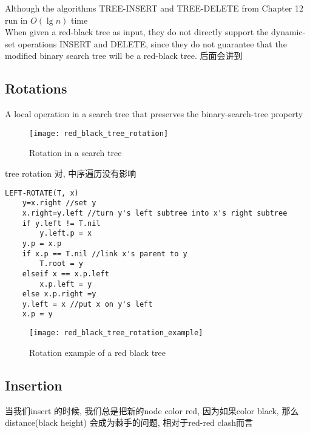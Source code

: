 \documentclass{article}
\begin{document}
Although the algorithms TREE-INSERT and TREE-DELETE from Chapter 12 run in $O(\lg n)$ time\\
When given a red-black tree as input, they do not directly support the dynamic-set operations INSERT and DELETE, since they do not guarantee that the modified binary search tree will be a red-black tree. 后面会讲到

\subsection{Rotations}
A local operation in a search tree that preserves the binary-search-tree property
\begin{figure}[htbp]
  \centering
  \texttt{[image: red\_black\_tree\_rotation]}\\
  \caption{Rotation in a search tree}\label{fig.rbt.rotation}
\end{figure}
tree rotation 对, 中序遍历没有影响

\begin{verbatim}
LEFT-ROTATE(T, x)
    y=x.right //set y
    x.right=y.left //turn y's left subtree into x's right subtree
    if y.left != T.nil
        y.left.p = x
    y.p = x.p
    if x.p == T.nil //link x's parent to y
        T.root = y
    elseif x == x.p.left
        x.p.left = y
    else x.p.right =y
    y.left = x //put x on y's left
    x.p = y
\end{verbatim}
\begin{figure}[htbp]
  \centering
  \texttt{[image: red\_black\_tree\_rotation\_example]}\\
  \caption{Rotation example of a red black tree}\label{fig.rbt.rotation.example}
\end{figure}

\subsection{Insertion}
当我们insert 的时候, 我们总是把新的node color red, 因为如果color black, 那么distance(black height) 会成为棘手的问题, 相对于red-red clash而言
\end{document}
